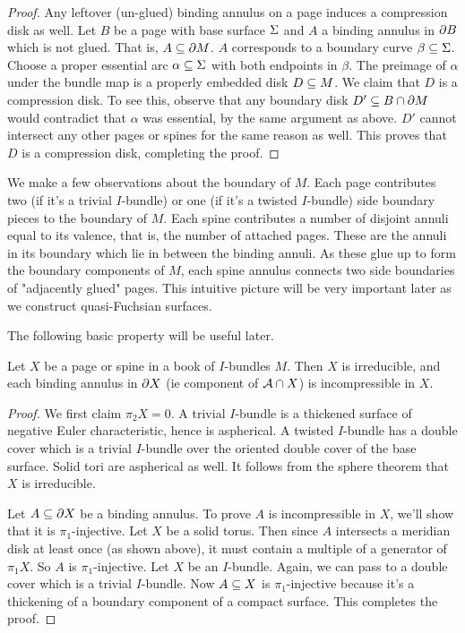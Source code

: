 \begin{proof}
Any leftover (un-glued) binding annulus on a page induces a compression disk as
well. Let $B$ be a page with base surface $\Sigma$ and $A$ a binding annulus in
$\partial B$ which is not glued. That is, $A \subseteq \partial M$. $A$ corresponds to
a boundary curve $\beta \subseteq \Sigma$. Choose a proper essential arc $\alpha \subseteq
\Sigma$ with both endpoints in $\beta$. The preimage of $\alpha$ under the bundle
map is a properly embedded disk $D \subseteq M$. We claim that $D$ is a compression
disk. To see this, observe that any boundary disk $D' \subseteq B \cap \partial M$ would
contradict that $\alpha$ was essential, by the same argument as above. $D'$
cannot intersect any other pages or spines for the same reason as well. This
proves that $D$ is a compression disk, completing the proof.

\end{proof}


We make a few observations about the boundary of $M$. Each page contributes two
(if it's a trivial $I$-bundle) or one (if it's a twisted $I$-bundle) side
boundary pieces to the boundary of $M$. Each spine contributes a number of
disjoint annuli equal to its valence, that is, the number of attached pages.
These are the annuli in its boundary which lie in between the binding annuli.
As these glue up to form the boundary components of $M$, each spine annulus
connects two side boundaries of "adjacently glued" pages. This intuitive
picture will be very important later as we construct quasi-Fuchsian surfaces.

The following basic property will be useful later.

\begin{prop}\label{P:pagespineII}

Let $X$ be a page or spine in a book of $I$-bundles $M$. Then $X$ is
irreducible, and each binding annulus in $\partial X$ (ie component of $\mathcal{A} \cap X$)
is incompressible in $X$.

\end{prop}

\begin{proof}

We first claim $\pi_2X = 0$. A trivial $I$-bundle is a thickened surface of
negative Euler characteristic, hence is aspherical. A twisted $I$-bundle has
a double cover which is a trivial $I$-bundle over the oriented double cover of
the base surface. Solid tori are aspherical as well. It follows from the sphere
theorem that $X$ is irreducible.

Let $A \subseteq \partial X$ be a binding annulus. To prove $A$ is incompressible in $X$,
we'll show that it is $\pi_1$-injective. Let $X$ be a solid torus. Then since
$A$ intersects a meridian disk at least once (as shown above), it must contain
a multiple of a generator of $\pi_1X$. So $A$ is $\pi_1$-injective. Let $X$ be
an $I$-bundle. Again, we can pass to a double cover which is a trivial
$I$-bundle.  Now $A \subseteq X$ is $\pi_1$-injective because it's a thickening of
a boundary component of a compact surface. This completes the proof.

\end{proof}

